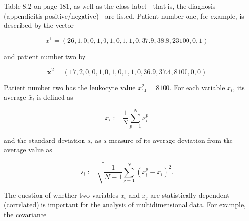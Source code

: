 \documentclass[10pt]{book}
\begin{document}
Table 8.2 on page 181, as well as the class label—that is, the diagnosis (appendicitis positive/negative)—are listed. Patient number one, for example, is described by the vector

$$
x^{1}=(26,1,0,0,1,0,1,0,1,1,0,37.9,38.8,23100,0,1)
$$

and patient number two by

$$
\boldsymbol{x}^{2}=(17,2,0,0,1,0,1,0,1,1,0,36.9,37.4,8100,0,0)
$$

Patient number two has the leukocyte value $x_{14}^{2}=8100$.
For each variable $x_{i}$, its average $\bar{x}_{i}$ is defined as

$$
\bar{x}_{i}:=\frac{1}{N} \sum_{p=1}^{N} x_{i}^{p}
$$

and the standard deviation $s_{i}$ as a measure of its average deviation from the average value as

$$
s_{i}:=\sqrt{\frac{1}{N-1} \sum_{p=1}^{N}\left(x_{i}^{p}-\bar{x}_{i}\right)^{2}} .
$$

The question of whether two variables $x_{i}$ and $x_{j}$ are statistically dependent (correlated) is important for the analysis of multidimensional data. For example, the covariance
\end{document}
